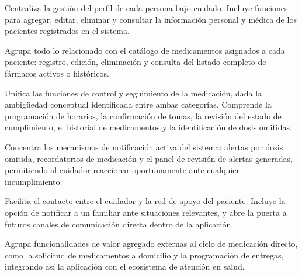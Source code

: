 \documentclass[11pt]{article}
\begin{document}
\noindent
\begin{mdframed}[backgroundcolor=softgray, linecolor=uniblue, linewidth=0.7pt,
    innertopmargin=8pt, innerbottommargin=8pt, innerleftmargin=10pt, innerrightmargin=10pt]
\small
\begin{description}[leftmargin=0pt, labelwidth=!, labelsep=0.4em, itemsep=5pt]

  \item[\color{uniblue}Pacientes.]
  Centraliza la gestión del perfil de cada persona bajo cuidado. Incluye
  funciones para agregar, editar, eliminar y consultar la información personal
  y médica de los pacientes registrados en el sistema.

  \item[\color{uniblue}Medicamentos.]
  Agrupa todo lo relacionado con el catálogo de medicamentos asignados a
  cada paciente: registro, edición, eliminación y consulta del listado completo
  de fármacos activos o históricos.

  \item[\color{uniblue}Tratamiento.]
  Unifica las funciones de control y seguimiento de la medicación, dada la
  ambigüedad conceptual identificada entre ambas categorías. Comprende la
  programación de horarios, la confirmación de tomas, la revisión del estado
  de cumplimiento, el historial de medicamentos y la identificación de dosis
  omitidas.

  \item[\color{uniblue}Alertas.]
  Concentra los mecanismos de notificación activa del sistema: alertas por
  dosis omitida, recordatorios de medicación y el panel de revisión de alertas
  generadas, permitiendo al cuidador reaccionar oportunamente ante cualquier
  incumplimiento.

  \item[\color{uniblue}Comunicación.]
  Facilita el contacto entre el cuidador y la red de apoyo del paciente.
  Incluye la opción de notificar a un familiar ante situaciones relevantes,
  y abre la puerta a futuros canales de comunicación directa dentro de la
  aplicación.

  \item[\color{uniblue}Servicios.]
  Agrupa funcionalidades de valor agregado externas al ciclo de medicación
  directo, como la solicitud de medicamentos a domicilio y la programación
  de entregas, integrando así la aplicación con el ecosistema de atención
  en salud.

\end{description}
\end{mdframed}
\end{document}
